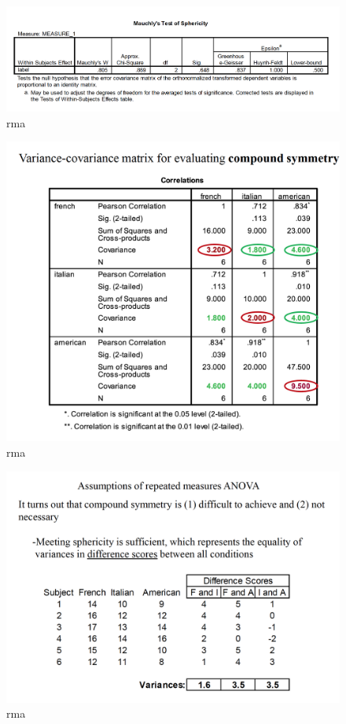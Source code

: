 \documentclass[]{book}
\theoremstyle{definition}
\theoremstyle{definition}
\theoremstyle{definition}
\theoremstyle{remark}
\begin{document}
\begin{figure}
\centering
\includegraphics{img/hicksrma12.png}
\caption{rma}
\end{figure}

\begin{figure}
\centering
\includegraphics{img/hicksrma13.png}
\caption{rma}
\end{figure}

\begin{figure}
\centering
\includegraphics{img/hicksrma14.png}
\caption{rma}
\end{figure}
\end{document}
